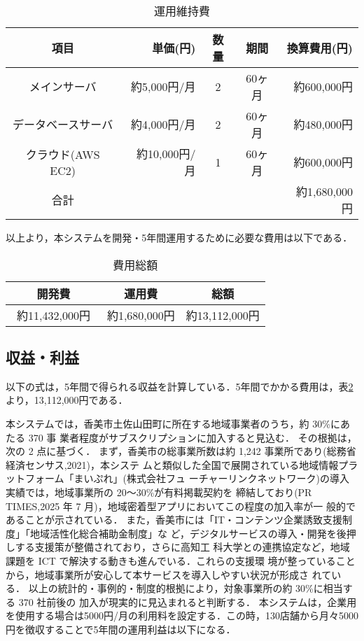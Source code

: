 \begin{table}[h]
  \centering
  \caption{運用維持費}
  \label{fig:Q11}
  \begin{tabular}{crccr}
  \hline
  項目  & 単価(円) & 数量  & 期間 & 換算費用(円) \\ \hline\hline
 
メインサーバ  & 約5,000円/月 & 2& 60ヶ月  & 約600,000円 \\ \hline

データベースサーバ & 約4,000円/月 &2& 60ヶ月 & 約480,000円 \\\hline

クラウド(AWS EC2)  &約10,000円/月&1 &60ヶ月 & 約600,000円 \\ \hline\hline

合計 &  & & & 約1,680,000円\\ \hline
\end{tabular}
\end{table}

以上より，本システムを開発・5年間運用するために必要な費用は以下である．
\begin{table}[h]
  \centering
  \caption{費用総額}
  \label{fig:Q12}
  \begin{tabular}{ccc}
  \hline
  開発費 & 運用費 & 総額  \\ \hline\hline
 約11,432,000円　& 約1,680,000円 & 約13,112,000円\\ \hline

\end{tabular}
\end{table}


\subsection{収益・利益}
以下の式は，5年間で得られる収益を計算している．5年間でかかる費用は，表\ref{fig:Q12}より，13,112,000円である．\par
本システムでは，香美市土佐山田町に所在する地域事業者のうち，約 30\%にあたる 370 事
業者程度がサブスクリプションに加入すると見込む．
その根拠は，次の 2 点に基づく．
まず，香美市の総事業所数は約 1,242 事業所であり(総務省経済センサス,2021)，本システ
ムと類似した全国で展開されている地域情報プラットフォーム「まいぷれ」(株式会社フュ
ーチャーリンクネットワーク)の導入実績では，地域事業所の 20〜30\%が有料掲載契約を
締結しており(PR TIMES,2025 年 7 月)，地域密着型アプリにおいてこの程度の加入率が一
般的であることが示されている．
また，香美市には「IT・コンテンツ企業誘致支援制度」「地域活性化総合補助金制度」な
ど，デジタルサービスの導入・開発を後押しする支援策が整備されており，さらに高知工
科大学との連携協定など，地域課題を ICT で解決する動きも進んでいる．これらの支援環
境が整っていることから，地域事業所が安心して本サービスを導入しやすい状況が形成さ
れている．
以上の統計的・事例的・制度的根拠により，対象事業所の約 30\%に相当する 370 社前後の
加入が現実的に見込まれると判断する．
本システムは，企業用を使用する場合は5000円/月の利用料を設定する．この時，130店舗から月々5000円を徴収することで5年間の運用利益は以下になる．\par

